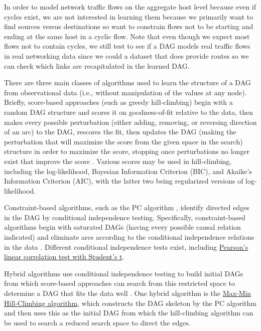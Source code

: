 \documentclass[conference]{IEEEtran}
\begin{document}
In order to model network traffic flows on the aggregate host level because even if cycles exist, we are not interested in learning them because we primarily want to find sources versus destinations so want to constrain flows not to be starting and ending at the same host in a cyclic flow. Note that even though we expect most flows not to contain cycles, we still test to see if a DAG models real traffic flows in real networking data since we could a dataset that does provide routes so we can check which links are recapitulated in the learned DAG.

There are three main classes of algorithms used to learn the structure of a DAG from observational data (i.e., without manipulation of the values at any node). Briefly, score-based approaches (such as greedy hill-climbing) begin with a random DAG structure and scores it on goodness-of-fit relative to the data, then makes every possible perturbation (either adding, removing, or reversing direction of an arc) to the DAG, rescores the fit, then updates the DAG (making the perturbation that will maximize the score from the given space in the search) structure in order to maximize the score, stopping once perturbations no longer exist that improve the score \cite{b9}. Various scores may be used in hill-climbing, including the log-likelihood, Bayesian Information Criterion (BIC), and Akaike’s Information Criterion (AIC), with the latter two being regularized versions of log-likelihood.

Constraint-based algorithms, such as the PC algorithm \cite{b10}, identify directed edges in the DAG by conditional independence testing. Specifically, constraint-based algorithms begin with saturated DAGs (having every possible causal relation indicated) and eliminate arcs according to the conditional independence relations in the data \cite{b9}. Different conditional independence tests exist, including \href{http://www.bnlearn.com/documentation/man/conditional.independence.tests.html}{Pearson’s linear correlation test with Student’s t}.

Hybrid algorithms use conditional independence testing to build initial DAGs from which score-based approaches can search from this restricted space to determine a DAG that fits the data well \cite{b9}. One hybrid algorithm is the  \href{https://link.springer.com/article/10.1007/s10994-006-6889-7}{Max-Min Hill-Climbing algorithm}, which constructs the DAG skeleton by the PC algorithm and then uses this as the initial DAG from which the hill-climbing algorithm can be used to search a reduced search space to direct the edges.
\end{document}
